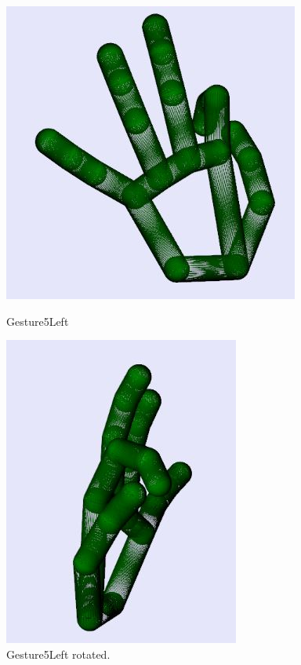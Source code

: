 \begin{figure}[H]
    \centering
    \begin{minipage}{0.5\textwidth}
        \centering
        \includegraphics[scale=.75]{Figures/gesture5Left.JPG} 
        \caption[Gesture5Left]{Gesture5Left}
		\label{fig:Gesture5Left}
    \end{minipage}\hfill
    \begin{minipage}{0.5\textwidth}
        \centering
        \includegraphics[scale=.75]{Figures/gesture5Left_rotated.JPG}
        \caption[Gesture5Left Rotated]{Gesture5Left rotated.}
        \label{fig:Gesture5Left_rotated}
    \end{minipage}
\end{figure}

